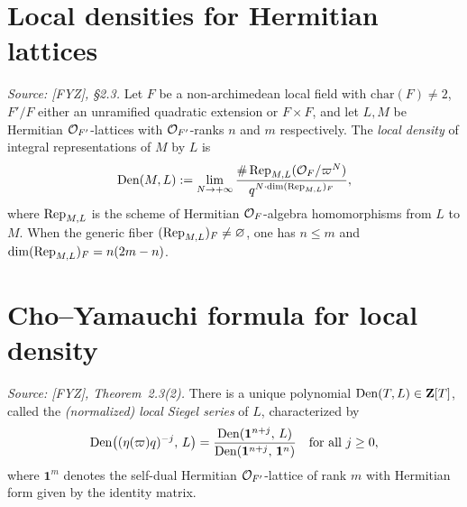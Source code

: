 \section{Local densities for Hermitian lattices}

\begin{definition}
  \label{def:local-density}
  \textit{Source: [FYZ], \S2.3.}
  Let \(F\) be a non-archimedean local field with \(\mathrm{char}(F) \neq 2\),
  \(F'/F\) either an unramified quadratic extension or \(F \times F\), and let
  \(L, M\) be Hermitian \(\mathcal{O}_{F'}\)-lattices with \(\mathcal{O}_{F'}\)-ranks \(n\) and \(m\)
  respectively. The \emph{local density} of integral representations of \(M\) by
  \(L\) is
  \[
    \operatorname{Den}(M, L) := \lim_{N \to +\infty}
      \frac{\# \operatorname{Rep}_{M,L}(\mathcal{O}_F / \varpi^N)}{q^{N \cdot \dim(\operatorname{Rep}_{M,L})_F}},
  \]
  where \(\operatorname{Rep}_{M,L}\) is the scheme of Hermitian \(\mathcal{O}_F\)-algebra homomorphisms from
  \(L\) to \(M\). When the generic fiber \((\operatorname{Rep}_{M,L})_F \neq \varnothing\), one has
  \(n \leq m\) and \(\dim(\operatorname{Rep}_{M,L})_F = n(2m - n)\).
\end{definition}

\section{Cho--Yamauchi formula for local density}

\begin{definition}
  \label{def:local-siegel-series}
  \textit{Source: [FYZ], Theorem~2.3(2).}
  There is a unique polynomial \(\operatorname{Den}(T, L) \in \mathbf{Z}[T]\), called the
  \emph{(normalized) local Siegel series} of \(L\), characterized by
  \[
    \operatorname{Den}\bigl((\eta(\varpi) q)^{-j},\, L\bigr) =
      \frac{\operatorname{Den}(\mathbf{1}^{n+j},\, L)}{\operatorname{Den}(\mathbf{1}^{n+j},\, \mathbf{1}^n)}
    \quad \text{for all } j \geq 0,
  \]
  where \(\mathbf{1}^m\) denotes the self-dual Hermitian \(\mathcal{O}_{F'}\)-lattice of
  rank \(m\) with Hermitian form given by the identity matrix.
\end{definition}

